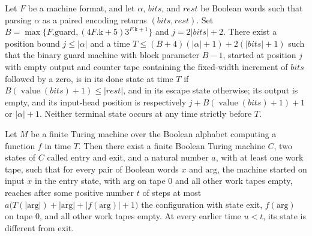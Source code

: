 \begin{lemma}
\label{Turing.MachineFormat.canonGuard_run}
\leanok
{}
Let $F$ be a machine format, and let $\alpha$, $bits$, and $rest$ be Boolean words such
that parsing $\alpha$ as a paired encoding returns $(bits,rest)$. Set
$B=\max\{F.\mathrm{guard},(4F.\mathrm{k}+5)3^{F.\mathrm{k}+1}\}$ and $j=2|bits|+2$.
There exist a position bound $j\le|\alpha|$ and a time
$T\le(B+4)(|\alpha|+1)+2(|bits|+1)$ such that the binary guard machine with block
parameter $B-1$, started at position $j$ with empty output and counter tape containing
the fixed-width increment of $bits$ followed by a zero, is in its done state at time $T$
if $B(\operatorname{value}(bits)+1)\le|rest|$, and in its escape state otherwise; its
output is empty, and its input-head position is respectively
$j+B(\operatorname{value}(bits)+1)+1$ or $|\alpha|+1$. Neither terminal state occurs at
any time strictly before $T$.
\end{lemma}

\begin{lemma}
\label{Turing.MachineFormat.canonStrictInstall}
\leanok
{}
Let $M$ be a finite Turing machine over the Boolean alphabet computing a function $f$ in
time $T$. Then there exist a finite Boolean Turing machine $C$, two states of $C$ called
entry and exit, and a natural number $a$, with at least one work tape, such that for
every pair of Boolean words $x$ and $\mathrm{arg}$, the machine started on input $x$ in
the entry state, with $\mathrm{arg}$ on tape $0$ and all other work tapes empty, reaches
after some positive number $t$ of steps at most
$a\bigl(T(|\mathrm{arg}|)+|\mathrm{arg}|+|f(\mathrm{arg})|+1\bigr)$ the configuration
with state exit, $f(\mathrm{arg})$ on tape $0$, and all other work tapes empty. At every
earlier time $u<t$, its state is different from exit.
\end{lemma}

